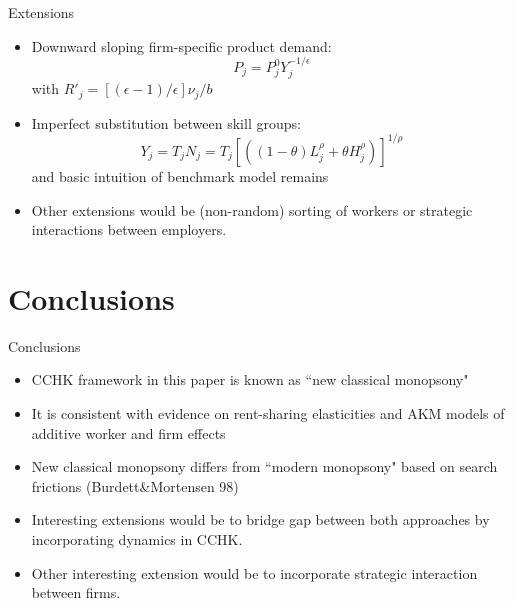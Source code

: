 \documentclass[notes=show]{beamer}
\begin{document}
\begin{frame}{Extensions}
\begin{itemize}
\item Downward sloping firm-specific product demand:
\begin{equation*}
    P_{j} = P_{j}^{0} Y_{j}^{-1/ \epsilon}
\end{equation*}
with $R'_{j} = [(\epsilon - 1)/ \epsilon] \nu_{j}/b$ \medskip
\item Imperfect substitution between skill groups:
\begin{equation*}
    Y_{j} = T_{j} N_{j} = T_{j} \left[ ( (1 - \theta) L_{j}^{\rho} + \theta H_{j}^{\rho}) \right]^{1/\rho}
\end{equation*}
and basic intuition of benchmark model remains \medskip
\item Other extensions would be (non-random) sorting of workers or strategic interactions between employers.
\end{itemize}
\end{frame}

\section{Conclusions}

\begin{frame}{Conclusions}
\begin{itemize}
\item CCHK framework in this paper is known as ``new classical monopsony" \medskip
\item It is consistent with evidence on rent-sharing elasticities and AKM models of additive worker and firm effects \medskip
\item New classical monopsony differs from ``modern monopsony" based on search frictions (Burdett\&Mortensen 98) \medskip
\item Interesting extensions would be to bridge gap between both approaches by incorporating dynamics in CCHK. \medskip
\item Other interesting extension would be to incorporate strategic interaction between firms.
\end{itemize}
\end{frame}
\end{document}
